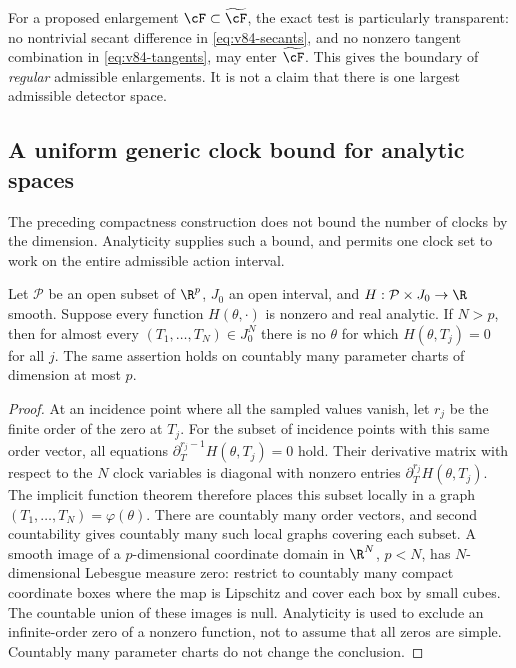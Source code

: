 For a proposed enlargement $\cF\subset\widetilde\cF$, the exact test
is particularly transparent: no nontrivial secant difference in
\eqref{eq:v84-secants}, and no nonzero tangent combination in
\eqref{eq:v84-tangents}, may enter $\widetilde\cF$. This gives the
boundary of \emph{regular} admissible enlargements. It is not a
claim that there is one largest admissible detector space.

\subsection{A uniform generic clock bound for analytic spaces}
The preceding compactness construction does not bound the number of
clocks by the dimension. Analyticity supplies such a bound, and permits
one clock set to work on the entire admissible action interval.

\begin{lemma}
\label{lem:v84-evaluations}
Let $\mathcal P$ be an open subset of $\R^p$, $J_0$ an open interval,
and $H:\mathcal P\times J_0\to\R$ smooth. Suppose every function
$H(\theta,\cdot)$ is nonzero and real analytic. If $N>p$, then for
almost every $(T_1,\ldots,T_N)\in J_0^N$ there is no $\theta$ for
which $H(\theta,T_j)=0$ for all $j$. The same assertion holds on
countably many parameter charts of dimension at most $p$.
\end{lemma}
\begin{proof}
At an incidence point where all the sampled values vanish, let $r_j$
be the finite order of the zero at $T_j$. For the subset of incidence
points with this same order vector, all equations
$\partial_T^{r_j-1}H(\theta,T_j)=0$ hold. Their derivative matrix
with respect to the $N$ clock variables is diagonal with nonzero
entries $\partial_T^{r_j}H(\theta,T_j)$. The implicit function theorem
therefore places this subset locally in a graph
$(T_1,\ldots,T_N)=\varphi(\theta)$. There are countably many order
vectors, and second countability gives countably many such local
graphs covering each subset. A smooth image of a $p$-dimensional
coordinate domain in $\R^N$, $p<N$, has $N$-dimensional Lebesgue
measure zero: restrict to countably many compact coordinate boxes
where the map is Lipschitz and cover each box by small cubes.
The countable union of these images is null. Analyticity is used to
exclude an infinite-order zero of a nonzero function, not to assume
that all zeros are simple. Countably many parameter charts do not
change the conclusion.
\end{proof}

